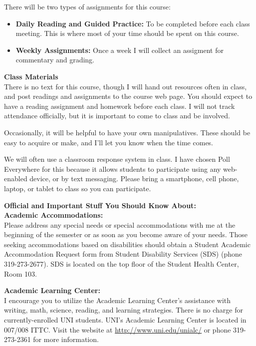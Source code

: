\documentclass[12pt]{amsart}
\begin{document}
There will be two types of assignments for this course:
\begin{itemize}
\item \textbf{Daily Reading and Guided Practice:} To be completed before each class meeting. This is where most of your time should be spent on this course.
\item \textbf{Weekly Assignments:} Once a week I will collect an assigment for commentary and grading.\\[.1in]
\end{itemize}

\noindent
\textbf{Class Materials}\\
There is no text for this course, though I will hand out resources often in class, and post readings and assignments to the course web page. You should expect to have a reading assignment and homework before each class. I will not track attendance officially, but it is important to come to class and be involved.

Occasionally, it will be helpful to have your own manipulatives. These should be easy to acquire or make, and I’ll let you know when the time comes.

We will often use a classroom response system in class. I have chosen Poll Everywhere for this because it allows students to participate using any web-enabled device, or by text messaging. Please bring a smartphone, cell phone, laptop, or tablet to class so you can participate.\\

\clearpage

\noindent
\textbf{Official and Important Stuff You Should Know About:}\\

\noindent
\textbf{Academic Accommodations:}\\
Please address any special needs or special accommodations with me at the beginning of the semester or as soon as you become aware of your needs. Those seeking accommodations based on disabilities should obtain a Student Academic Accommodation Request form from Student Disability Services (SDS) (phone 319-273-2677). SDS is located on the top floor of the Student Health Center, Room 103.

\noindent
\textbf{Academic Learning Center:}\\
I encourage you to utilize the Academic Learning Center’s assistance with writing, math, science, reading, and learning strategies. There is no charge for currently-enrolled UNI students. UNI’s Academic Learning Center is located in 007/008 ITTC. Visit the website at \url{http://www.uni.edu/unialc/} or phone 319-273-2361 for more information.\\
\end{document}
